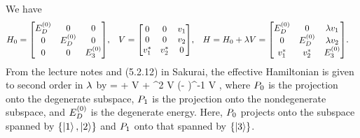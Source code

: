 \begin{solution}
	We have
	\begin{align*}
		\Ho &= \mqty[ \Eod & 0 & 0 \\ 0 & \Eod & 0 \\ 0 & 0 & \Eoe ], &
		V &= \mqty[ 0 & 0 & \vq \\ 0 & 0 & \vw \\ \vqs & \vws & 0 ], &
		H &= \Ho + \lam V = \mqty[ \Eod & 0 & \lam \vq \\ 0 & \Eod & \lam \vw \\ \vqs & \vws & \Eoe].
	\end{align*}
	From the lecture notes and (5.2.12) in Sakurai, the effective Hamiltonian is given to second order in $\lambda$ by
	\beq
		\Heff = \Eod + \lam \Po V \Po + \lam^2 \Po V \Pq (\Eod - \Ho)^{-1} \Pq V \Po,
	\eeq
	where $P_0$ is the projection onto the degenerate subspace, $P_1$ is the projection onto the nondegenerate subspace, and $E^{(0)}_D$ is the degenerate energy.  Here, $P_0$ projects onto the subspace spanned by $\{ \ket{1}, \ket{2} \}$ and $P_1$ onto that spanned by $\{ \ket{3} \}$.
	

\end{solution}
